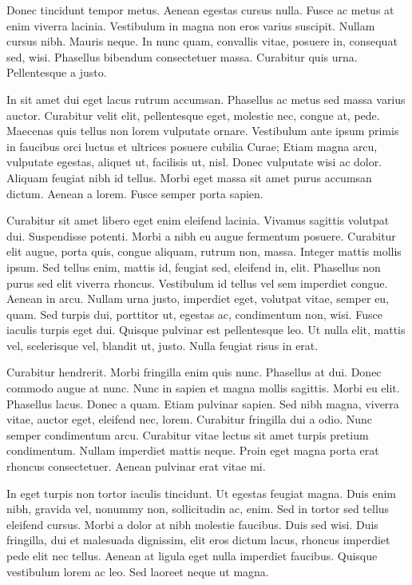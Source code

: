 \documentclass{article}
\begin{document}
Donec tincidunt tempor metus. Aenean egestas cursus nulla. Fusce ac metus
at enim viverra lacinia. Vestibulum in magna non eros varius suscipit. Nullam
cursus nibh. Mauris neque. In nunc quam, convallis vitae, posuere in, consequat
sed, wisi. Phasellus bibendum consectetuer massa. Curabitur quis urna.
Pellentesque a justo.

In sit amet dui eget lacus rutrum accumsan. Phasellus ac metus sed massa varius
auctor. Curabitur velit elit, pellentesque eget, molestie nec, congue at, pede.
Maecenas quis tellus non lorem vulputate ornare. Vestibulum ante ipsum primis
in faucibus orci luctus et ultrices posuere cubilia Curae; Etiam magna arcu,
vulputate egestas, aliquet ut, facilisis ut, nisl. Donec vulputate wisi ac
dolor. Aliquam feugiat nibh id tellus. Morbi eget massa sit amet purus accumsan
dictum. Aenean a lorem. Fusce semper porta sapien.

Curabitur sit amet libero eget enim eleifend lacinia. Vivamus sagittis
volutpat dui. Suspendisse potenti. Morbi a nibh eu augue fermentum posuere.
Curabitur elit augue, porta quis, congue aliquam, rutrum non, massa. Integer
mattis mollis ipsum. Sed tellus enim, mattis id, feugiat sed, eleifend in,
elit. Phasellus non purus sed elit viverra rhoncus. Vestibulum id tellus vel
sem imperdiet congue. Aenean in arcu. Nullam urna justo, imperdiet eget,
volutpat vitae, semper eu, quam. Sed turpis dui, porttitor ut, egestas ac,
condimentum non, wisi. Fusce iaculis turpis eget dui. Quisque pulvinar est
pellentesque leo. Ut nulla elit, mattis vel, scelerisque vel, blandit ut,
justo. Nulla feugiat risus in erat.

Curabitur hendrerit. Morbi fringilla enim quis nunc. Phasellus at dui.
Donec commodo augue at nunc. Nunc in sapien et magna mollis sagittis. Morbi eu
elit. Phasellus lacus. Donec a quam. Etiam pulvinar sapien. Sed nibh magna,
viverra vitae, auctor eget, eleifend nec, lorem. Curabitur fringilla dui a
odio. Nunc semper condimentum arcu. Curabitur vitae lectus sit amet turpis
pretium condimentum. Nullam imperdiet mattis neque. Proin eget magna porta erat
rhoncus consectetuer. Aenean pulvinar erat vitae mi.

In eget turpis non tortor iaculis tincidunt. Ut egestas feugiat magna. Duis
enim nibh, gravida vel, nonummy non, sollicitudin ac, enim. Sed in tortor sed
tellus eleifend cursus. Morbi a dolor at nibh molestie faucibus. Duis sed wisi.
Duis fringilla, dui et malesuada dignissim, elit eros dictum lacus, rhoncus
imperdiet pede elit nec tellus. Aenean at ligula eget nulla imperdiet faucibus.
Quisque vestibulum lorem ac leo. Sed laoreet neque ut magna.
\end{document}
